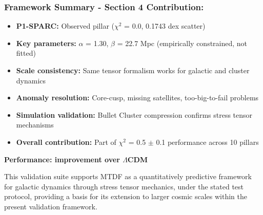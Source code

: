\documentclass[11pt,a4paper]{article}
\begin{document}
\begin{mdframed}[linecolor=accent,linewidth=0.5pt,backgroundcolor=callout-bg,leftline=true,rightline=true,topline=true,bottomline=true,innerleftmargin=8pt,innerrightmargin=8pt,innertopmargin=6pt,innerbottommargin=6pt]
\subsubsection{Framework Summary - Section 4 Contribution:}
\begin{itemize}
  \item \textbf{P1-SPARC:} \checkmark{} Observed pillar ($\chi$$^{2}$ = 0.0, 0.1743 dex scatter)
  \item \textbf{Key parameters:} $\alpha$ = 1.30, $\beta$ = 22.7 Mpc (empirically constrained, not fitted)
  \item \textbf{Scale consistency:} Same tensor formalism works for galactic and cluster dynamics
  \item \textbf{Anomaly resolution:} Core-cusp, missing satellites, too-big-to-fail problems
  \item \textbf{Simulation validation:} Bullet Cluster compression confirms stress tensor mechanisms
  \item \textbf{Overall contribution:} Part of $\chi$$^{2}$ = 0.5 $\pm$ 0.1 performance across 10 pillars
\end{itemize}

\textbf{Performance: improvement over $\Lambda$CDM}
\end{mdframed}

This validation suite supports MTDF as a quantitatively predictive framework for galactic dynamics through stress tensor mechanics, under the stated test protocol, providing a basis for its extension to larger cosmic scales within the present validation framework.
\end{document}
